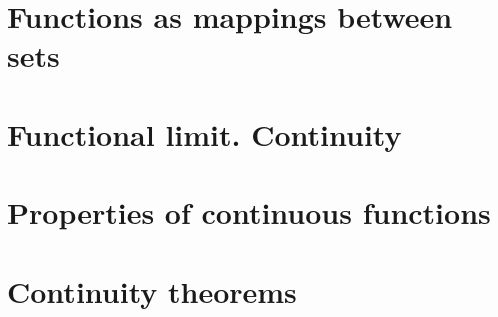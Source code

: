 
\section{Functions as mappings between sets}

\section{Functional limit. Continuity}

\section{Properties of continuous functions}

\section{Continuity theorems}
